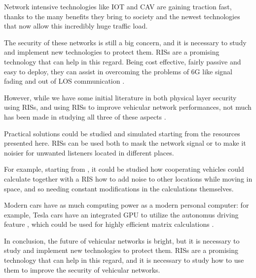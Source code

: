 Network intensive technologies like IOT and CAV are gaining traction fast, thanks to the many benefits they bring to society and the newest technologies that now allow this incredibly huge traffic load.

The security of these networks is still a big concern, and it is necessary to study and implement new technologies to protect them. RISs are a promising technology that can help in this regard. Being cost effective, fairly passive and easy to deploy, they can assist in overcoming the problems of 6G like signal fading and out of LOS communication \cite{8796365}.

However, while we have some initial literature in both physical layer security using RISs, and using RISs to improve vehicular network performances, not much has been made in studying all three of these aspects \cite{makarfi2020reconfigurableintelligentsurfacesenabledvehicular}.

Practical solutions could be studied and simulated starting from the resources presented here. RISs can be used both to mask the network signal or to make it noisier for unwanted listeners located in different places.

For example, starting from \cite{4543070}, it could be studied how cooperating vehicles could calculate together with a RIS how to add noise to other locations while moving in space, and so needing constant modifications in the calculations themselves.

Modern cars have as much computing power as a modern personal computer: for example, Tesla cars have an integrated GPU to utilize the autonomus driving feature \cite{10586734}, which could be used for highly efficient matrix calculations \cite{1011452699470}.

In conclusion, the future of vehicular networks is bright, but it is necessary to study and implement new technologies to protect them. RISs are a promising technology that can help in this regard, and it is necessary to study how to use them to improve the security of vehicular networks.